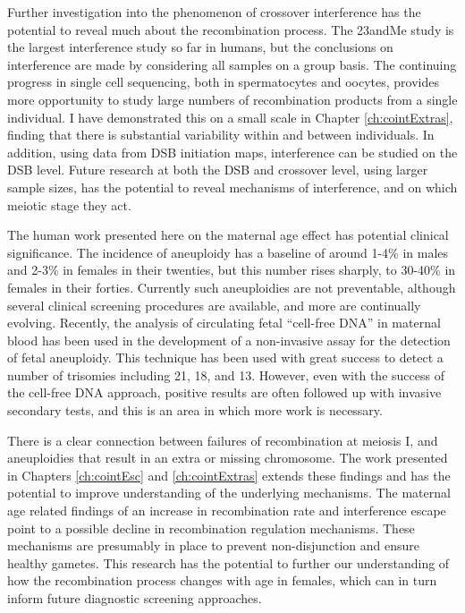 Further investigation into the phenomenon of crossover interference has the potential to reveal much about the recombination process.
The 23andMe study is the largest interference study so far in humans, but the conclusions on interference are made by considering all samples on a group basis.
The continuing progress in single cell sequencing, both in spermatocytes and oocytes, provides more opportunity to study large numbers of recombination products from a single individual.
I have demonstrated this on a small scale in Chapter \ref{ch:cointExtras}, finding that there is substantial variability within and between individuals.
In addition, using data from DSB initiation maps\cite{Pratto2014}, interference can be studied on the DSB level.
Future research at both the DSB and crossover level, using larger sample sizes, has the potential to reveal mechanisms of interference, and on which meiotic stage they act.

The human work presented here on the maternal age effect has potential clinical significance.
The incidence of aneuploidy has a baseline of around 1-4\% in males and 2-3\% in females in their twenties, but this number rises sharply, to 30-40\% in females in their forties\cite{Hassold2009,Nagaoka2012}.
Currently such aneuploidies are not preventable, although several clinical screening procedures are available, and more are continually evolving.
Recently, the analysis of circulating fetal ``cell-free DNA'' in maternal blood has been used in the development of a non-invasive assay for the detection of fetal aneuploidy\cite{Lo2007}.
This technique has been used with great success to detect a number of trisomies including 21\cite{Papageorgiou2011}, 18\cite{Palomaki2012}, and 13\cite{Palomaki2012}.
However, even with the success of the cell-free DNA approach, positive results are often followed up with invasive secondary tests, and this is an area in which more work is necessary.

There is a clear connection between failures of recombination at meiosis I, and aneuploidies that result in an extra or missing chromosome\cite{Nagaoka2012}.
The work presented in Chapters \ref{ch:cointEsc} and \ref{ch:cointExtras} extends these findings and has the potential to improve understanding of the underlying mechanisms.
The maternal age related findings of an increase in recombination rate and interference escape point to a possible decline in recombination regulation mechanisms.
These mechanisms are presumably in place to prevent non-disjunction and ensure healthy gametes.
This research has the potential to further our understanding of how the recombination process changes with age in females, which can in turn inform future diagnostic screening approaches.


